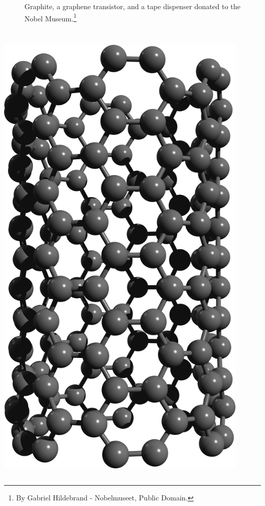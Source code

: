 \documentclass{beamer}
\begin{document}
\begin{frame}
\begin{columns}
\begin{figure}
{\scriptsize Graphite, a graphene transistor, and a tape dispenser donated to
the Nobel Museum.}\footnote[frame]{\tiny By
Gabriel Hildebrand - Nobelmuseet, Public Domain.}
\end{figure}

\end{columns}

\hspace{5mm}

\end{frame}




\begin{frame}

\begin{columns}


\begin{center}
\includegraphics[width=0.9\textwidth]{figs/nanotube2.png}\\


\end{center}
\end{columns}
\end{frame}
\end{document}
